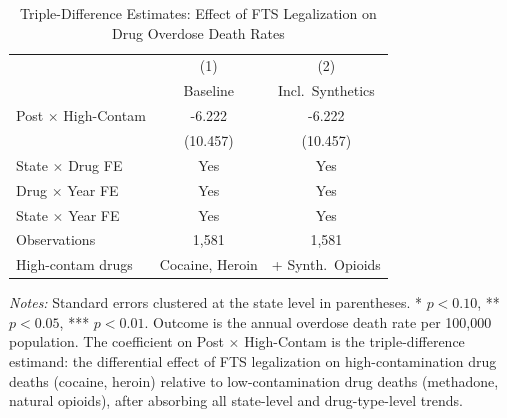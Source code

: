 \begin{table}[H]
\centering
\caption{Triple-Difference Estimates: Effect of FTS Legalization on Drug Overdose Death Rates}
\label{tab:main}
\begin{threeparttable}
\begin{tabular}{lcc}
\toprule
 & (1) & (2) \\
 & Baseline & Incl.\ Synthetics \\
\midrule
Post $\times$ High-Contam & -6.222 & -6.222 \\
 & (10.457) & (10.457) \\
\midrule
State $\times$ Drug FE & Yes & Yes \\
Drug $\times$ Year FE & Yes & Yes \\
State $\times$ Year FE & Yes & Yes \\
Observations & 1,581 & 1,581 \\
High-contam drugs & Cocaine, Heroin & + Synth.\ Opioids \\
\bottomrule
\end{tabular}
\begin{tablenotes}[flushleft]
\small
\item \textit{Notes:} Standard errors clustered at the state level in parentheses. * $p<0.10$, ** $p<0.05$, *** $p<0.01$. Outcome is the annual overdose death rate per 100,000 population. The coefficient on Post $\times$ High-Contam is the triple-difference estimand: the differential effect of FTS legalization on high-contamination drug deaths (cocaine, heroin) relative to low-contamination drug deaths (methadone, natural opioids), after absorbing all state-level and drug-type-level trends.
\end{tablenotes}
\end{threeparttable}
\end{table}

